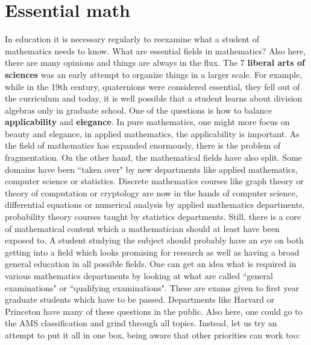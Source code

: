 \documentclass[12pt]{amsart}
\newcounter{example}    \def\example#1{ \item \fontsize{12}{15} \selectfont #1 \fontsize{12}{15} \selectfont }
\begin{document}
\section*{Essential math}

In education it is necessary regularly to reexamine what a student of mathematics needs to know. 
What are essential fields in mathematics? Also here, there are many opinions and things are always in the 
flux. The 7 {\bf liberal arts of sciences} was an early attempt to organize things in a larger scale.
For example, while in the 19th century, quaternions were considered essential, they
fell out of the curriculum and today, it is well possible that a student learns about 
division algebras only in graduate school. 
One of the questions is how to balance {\bf applicability} and {\bf elegance}.
In pure mathematics, one might more focus on beauty and elegance, in applied mathematics, the
applicability is important. As the field of mathematics has expanded enormously, there
is the problem of fragmentation. On the other hand, the mathematical fields have also split. 
Some domains have been ``taken over" by new departments like applied mathematics, computer science 
or statistics. Discrete mathematics courses like graph theory or theory of computation or 
cryptology are now in the hands of computer science, differential equations or numerical analysis by
applied mathematics departments, probability theory courses taught by statistics
departments. Still, there is a core of mathematical content which a mathematician should at least 
have been exposed to. A student studying the subject should probably have an eye on both getting into 
a field which looks promising for research as well as having a broad general education in all
possible fields. One can get an idea what is required in various mathematics departments by 
looking at what are called ``general examinations" or ``qualifying examinations". These are
exams given to first year graduate students which have to be passed. Departments like 
Harvard \cite{HarvardQuals} or Princeton \cite{PrincetonGenerals} have many of these questions 
in the public. Also here, one could go to the AMS classification and grind through all topics.
Instead, let us try an attempt to put it all in one box, being aware that other priorities can
work too:  \\
\end{document}
